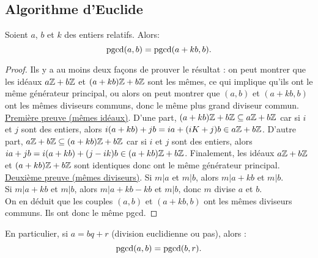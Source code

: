 \subsection{Algorithme d'Euclide}

\begin{lemme}[d'Euclide]
Soient $a$, $b$ et $k$ des entiers relatifs. Alors:
\[ \operatorname{pgcd}(a,b) = \operatorname{pgcd}(a+kb,b).\]
\end{lemme}

\begin{proof}
Ils y a au moins deux façons de prouver le résultat : on peut montrer que les idéaux $a\mathbb{Z}+b\mathbb{Z}$ et $(a+kb)\mathbb{Z}+b\mathbb{Z}$ sont les mêmes, ce qui implique qu'ils ont le même générateur principal, ou alors on peut montrer que $(a,b)$ et $(a+kb,b)$ ont les mêmes diviseurs communs, donc le même plus grand diviseur commun.\\
\underline{Première preuve (mêmes idéaux)}.
D'une part, $(a+kb)\mathbb{Z}+b\mathbb{Z} \subseteq a\mathbb{Z}+b\mathbb{Z}$ car si $i$ et $j$ sont des entiers, alors $i(a+kb)+jb = ia+(iK+j)b \in a\mathbb{Z}+b\mathbb{Z}$.
D'autre part, $a\mathbb{Z}+b\mathbb{Z} \subseteq (a+kb)\mathbb{Z}+b\mathbb{Z}$ car si $i$ et $j$ sont des entiers, alors $ia+jb = i(a+kb) +(j-ik)b \in (a+kb)\mathbb{Z}+b\mathbb{Z}$.
Finalement, les idéaux $a\mathbb{Z}+b\mathbb{Z}$ et $(a+kb)\mathbb{Z}+b\mathbb{Z}$ sont identiques donc ont le même générateur principal.\\
\underline{Deuxième preuve (mêmes diviseurs)}.
Si $m|a$ et $m|b$, alors $m|a+kb$ et $m|b$.\\
Si $m|a+kb$ et $m|b$, alors $m|a+kb-kb$ et $m|b$, donc $m$ divise $a$ et $b$.\\
On en déduit que les couples $(a,b)$ et $(a+kb,b)$ ont les mêmes diviseurs communs. Ils ont donc le même pgcd.
\end{proof}

\begin{corollaire} En particulier, si $a = bq+r$ (division euclidienne ou pas), alors :
\[ \operatorname{pgcd}(a,b) = \operatorname{pgcd}(b,r).\]
\end{corollaire}

